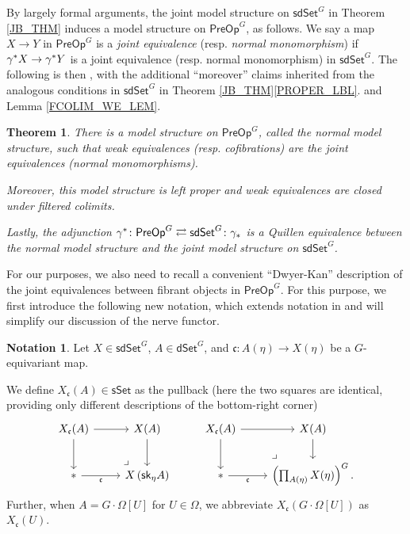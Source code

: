\documentclass[a4paper,10pt
,draft
]{article}%
\numberwithin{equation}{section}
\numberwithin{figure}{section}
\newtheorem{theorem}[equation]{Theorem}%
\theoremstyle{definition} %
\newtheorem{notation}[equation]{Notation}%
\newcommand{\sdSet}{\mathsf{sdSet}}
\newcommand{\PreOp}{\mathsf{PreOp}}
\newcommand{\1}{\ensuremath{\mathbbm 1}}%
\begin{document}
By largely formal arguments, the joint model structure on 
$\mathsf{sdSet}^G$ in Theorem \ref{JB_THM}
induces a model structure on $\mathsf{PreOp}^G$,
as follows.
%
We say a map $X \to Y$ in $\PreOp^G$ is a 
\textit{joint equivalence} (resp. \textit{normal monomorphism}) if
$\gamma^{\**} X \to \gamma^{\**} Y$ is a joint equivalence 
(resp. normal monomorphism) in $\sdSet^G$.
%
The following is then \cite[Thms. 4.39 and 4.42]{BP_edss},
with the additional ``moreover'' claims 
inherited from the 
analogous conditions in $\mathsf{sdSet}^G$ in
Theorem \ref{JB_THM}\ref{PROPER_LBL}.
and Lemma \ref{FCOLIM_WE_LEM}.


\begin{theorem}\label{PREOPMS THM}
	There is a model structure on $\PreOp^G$, called the 
	\emph{normal model structure}, 
	such that weak equivalences (resp. cofibrations) are the joint equivalences (normal monomorphisms).
	
	Moreover, this model structure is left proper
	and weak equivalences are closed under filtered colimits.
	
	Lastly, the adjunction $\gamma^{\**} \colon \PreOp^G \rightleftarrows \sdSet^G \colon \gamma_{\**}$ is a Quillen equivalence
	between the normal model structure and the joint model structure on $\sdSet^G$.
\end{theorem}


For our purposes, we also need to recall
a convenient ``Dwyer-Kan'' description of the joint equivalences
between fibrant objects in $\PreOp^G$.
For this purpose, we first introduce the following new notation,
which extends notation in \cite[Def. 5.7]{BP_edss}
and {\color{blue} will simplify our discussion of the nerve functor}.



\begin{notation}\label{XUDECALT NOT}
	Let $X \in \mathsf{sdSet}^G$, 
	$A \in \mathsf{dSet}^G$,
	and $\mathfrak{c} \colon A(\eta) \to X(\eta)$ 
	be a $G$-equivariant map.
	
	We define $X_{\mathfrak{c}}(A)\in \mathsf{sSet}$
	as the pullback	
	(here the two squares are identical,
	providing only different descriptions of the bottom-right corner)
\begin{equation}\label{XUDECALT EQ}
\begin{tikzcd}
	X_{\mathfrak{c}}(A) \ar{r} \ar{d}
&
	X(A) \ar{d}
&%
	X_{\mathfrak{c}}(A) \ar{r} \ar{d}
&
	X(A) \ar{d}
\\
	\** \ar{r}[swap]{\mathfrak{c}} 
&
	X \left( \mathsf{sk}_{\eta} A \right)
	\arrow[lu, phantom, "\lrcorner", very near start]
&%
	\** \ar{r}[swap]{\mathfrak{c}} 
&
	\left(\prod_{A(\eta)} X(\eta)\right)^G.
	\arrow[lu, phantom, "\lrcorner", very near start]
\end{tikzcd}
\end{equation}
Further, when $A = G \cdot \Omega[U]$
for $U \in \Omega$,
we abbreviate
$X_{\mathfrak{c}}(G \cdot \Omega[U])$
as 
$X_{\mathfrak{c}}(U)$.
\end{notation}
\end{document}
